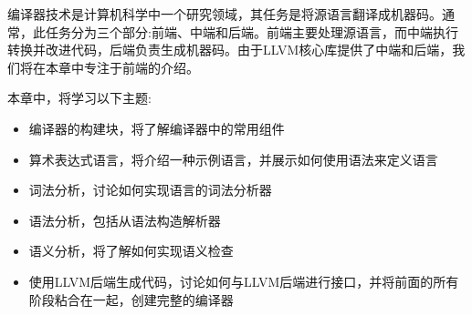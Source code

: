 编译器技术是计算机科学中一个研究领域，其任务是将源语言翻译成机器码。通常，此任务分为三个部分:前端、中端和后端。前端主要处理源语言，而中端执行转换并改进代码，后端负责生成机器码。由于LLVM核心库提供了中端和后端，我们将在本章中专注于前端的介绍。

本章中，将学习以下主题:

\begin{itemize}
\item
编译器的构建块，将了解编译器中的常用组件

\item
算术表达式语言，将介绍一种示例语言，并展示如何使用语法来定义语言

\item
词法分析，讨论如何实现语言的词法分析器

\item
语法分析，包括从语法构造解析器

\item
语义分析，将了解如何实现语义检查

\item
使用LLVM后端生成代码，讨论如何与LLVM后端进行接口，并将前面的所有阶段粘合在一起，创建完整的编译器
\end{itemize}












